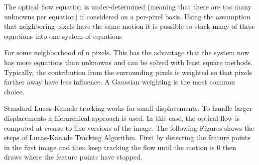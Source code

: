 \documentclass[12pt,fleqn]{book} %
\begin{document}
The optical flow equation is under-determined (meaning that there are too many unknowns per equation) if considered on a per-pixel basis. Using the assumption that neighboring pixels have the same motion it is possible to stack many of these equations into one system of equations\bigskip

For some neighborhood of n pixels. This has the advantage that the system now has more equations than unknowns and can be solved with least square methods. Typically, the contribution from the surrounding pixels is weighted so that pixels farther away have less influence. A Gaussian weighting is the most common choice.\bigskip

Standard Lucas-Kanade tracking works for small displacements. To handle larger displacements a hierarchical approach is used. In this case, the optical flow is computed at coarse to fine versions of the image. The following Figures shows the steps of Lucas-Kanade Tracking Algorithm. First by detecting the feature points in the first image and then keep tracking the flow until the motion is 0 then draws where the feature points have stopped. \bigskip

\begin{figure}[h]
\begin{dBox}
\centering
  \mbox{
   }
   \caption{\label{fig:dynamic121314} }   
\end{dBox}   
\end{figure}
\end{document}
